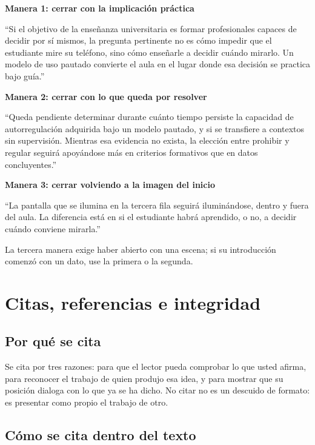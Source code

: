 \documentclass[12pt,a4paper,openany]{report}
\newenvironment{ejemplo}[1]
	{\begin{lrbox}{\cajaguardada}\begin{minipage}{\dimexpr\textwidth-2\fboxsep\relax}\vspace{4pt}\textcolor{verdeejemplo}{\textbf{\sffamily\small #1}}\par\vspace{3pt}\small}
	{\vspace{4pt}\end{minipage}\end{lrbox}\par\vspace{4pt}\noindent\colorbox{cremaejemplo}{\usebox{\cajaguardada}}\par\vspace{8pt}}
\begin{document}
\begin{ejemplo}{Manera 1: cerrar con la implicaci\'on pr\'actica}
``Si el objetivo de la ense\~nanza universitaria es formar profesionales capaces de decidir por s\'i mismos, la pregunta pertinente no es c\'omo impedir que el estudiante mire su tel\'efono, sino c\'omo ense\~narle a decidir cu\'ando mirarlo. Un modelo de uso pautado convierte el aula en el lugar donde esa decisi\'on se practica bajo gu\'ia.''
\end{ejemplo}

\begin{ejemplo}{Manera 2: cerrar con lo que queda por resolver}
``Queda pendiente determinar durante cu\'anto tiempo persiste la capacidad de autorregulaci\'on adquirida bajo un modelo pautado, y si se transfiere a contextos sin supervisi\'on. Mientras esa evidencia no exista, la elecci\'on entre prohibir y regular seguir\'a apoy\'andose m\'as en criterios formativos que en datos concluyentes.''
\end{ejemplo}

\begin{ejemplo}{Manera 3: cerrar volviendo a la imagen del inicio}
``La pantalla que se ilumina en la tercera fila seguir\'a ilumin\'andose, dentro y fuera del aula. La diferencia est\'a en si el estudiante habr\'a aprendido, o no, a decidir cu\'ando conviene mirarla.''
\end{ejemplo}

La tercera manera exige haber abierto con una escena; si su introducci\'on comenz\'o con un dato, use la primera o la segunda.

\chapter{Citas, referencias e integridad}

\section{Por qu\'e se cita}

Se cita por tres razones: para que el lector pueda comprobar lo que usted afirma, para reconocer el trabajo de quien produjo esa idea, y para mostrar que su posici\'on dialoga con lo que ya se ha dicho. No citar no es un descuido de formato: es presentar como propio el trabajo de otro.

\section{C\'omo se cita dentro del texto}
\end{document}
